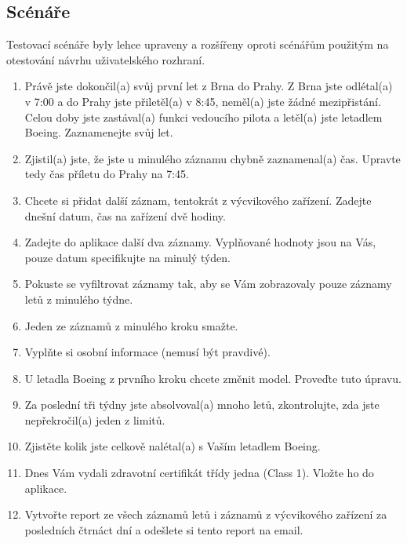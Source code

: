 \documentclass[thesis=M,czech]{FITthesis}[2012/06/26]
\begin{document}
\subsection{Scénáře}
Testovací scénáře byly lehce upraveny a rozšířeny oproti scénářům použitým na otestování návrhu uživatelského rozhraní.

\begin{enumerate}
\item Právě jste dokončil(a) svůj první let z Brna do Prahy. Z Brna jste odlétal(a) v 7:00 a do Prahy jste přiletěl(a) v 8:45, neměl(a) jste žádné mezipřistání. Celou doby jste zastával(a) funkci vedoucího pilota a letěl(a) jste letadlem Boeing. Zaznamenejte svůj let.
\item Zjistil(a) jste, že jste u minulého záznamu chybně zaznamenal(a) čas. Upravte tedy čas příletu do Prahy na 7:45.
\item Chcete si přidat další záznam, tentokrát z výcvikového zařízení. Zadejte dnešní datum, čas na zařízení dvě hodiny.
\item Zadejte do aplikace další dva záznamy. Vyplňované hodnoty jsou na Vás, pouze datum specifikujte na minulý týden.
\item Pokuste se vyfiltrovat záznamy tak, aby se Vám zobrazovaly pouze záznamy letů z minulého týdne.
\item Jeden ze záznamů z minulého kroku smažte.
\item Vyplňte si osobní informace (nemusí být pravdivé).
\item U letadla Boeing z prvního kroku chcete změnit model. Proveďte tuto úpravu.
\item Za poslední tři týdny jste absolvoval(a) mnoho letů, zkontrolujte, zda jste nepřekročil(a) jeden z limitů.
\item Zjistěte kolik jste celkově nalétal(a) s Vaším letadlem Boeing.
\item Dnes Vám vydali zdravotní certifikát třídy jedna (Class 1). Vložte ho do aplikace.
\item Vytvořte report ze všech záznamů letů i záznamů z výcvikového zařízení za posledních čtrnáct dní a odešlete si tento report na email.
\end{enumerate}
\end{document}
